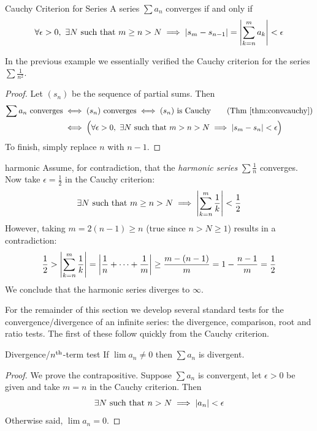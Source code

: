 \begin{thm}{Cauchy Criterion for Series}{}
	A series $\sum a_n$ converges if and only if
	\[
		\forall\epsilon>0,\ \exists N\text{ such that }m\ge n>N\implies\left| s_m-s_{n-1}\right|=\left| \sum_{k=n}^ma_k\right|<\epsilon
	\]
\end{thm}

In the previous example we essentially verified the Cauchy criterion for the series $\sum\frac 1{n^2}$.

\begin{proof}
	Let $(s_n)$ be the sequence of partial sums. Then
	\begin{align*}
		\sum a_n\text{ converges}&\iff (s_n)\text{ converges} \iff (s_n)\text{ is Cauchy} \tag{Thm \ref{thm:convcauchy}}\\
		&\iff \Bigl(\forall\epsilon>0,\ \exists N\text{ such that }m>n>N\implies\nm{s_m-s_n}<\epsilon\Bigr)
	\end{align*}
	To finish, simply replace $n$ with $n-1$. 
\end{proof}

\begin{example}{}{harmonic}
	Assume, for contradiction, that the \emph{harmonic series} $\sum\frac 1n$ converges. Now take $\epsilon=\frac 12$ in the Cauchy criterion:
	\[\exists N\text{ such that }m\ge n>N\implies \left| \sum_{k=n}^{m}\frac 1k\right|<\frac 12\]
	However, taking $m=2(n-1)\ge n$ (true since $n>N\ge 1$) results in a contradiction: 
	\[\frac 12>\left| \sum_{k=n}^{m}\frac 1k\right|=\left| \frac 1n+\cdots+\frac 1m\right|\ge \frac{m-(n-1)}{m}=1-\frac{n-1}m=\frac 12\]
	We conclude that the harmonic series diverges to $\infty$.
\end{example}

\goodbreak



For the remainder of this section we develop several standard tests for the convergence/divergence of an infinite series: the divergence, comparison, root and ratio tests. The first of these follow quickly from the Cauchy criterion.

\begin{thm}{Divergence/$n\textsuperscript{th}$-term test}{}
	If $\lim a_n\neq 0$ then $\sum a_n$ is divergent.
\end{thm}

\begin{proof}
	We prove the contrapositive. Suppose $\sum a_n$ is convergent, let $\epsilon>0$ be given and take $m=n$ in the Cauchy criterion. Then
	\[\exists N\text{ such that }n>N\implies\left| a_n\right|<\epsilon\]
	Otherwise said, $\lim a_n=0$.
\end{proof}



